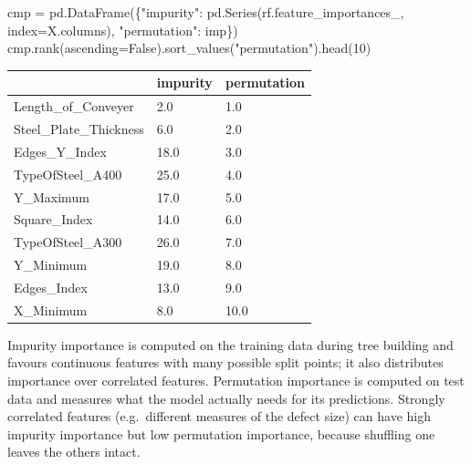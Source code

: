 \documentclass[
  letterpaper,
  DIV=11,
  numbers=noendperiod]{scrreprt}
\newenvironment{Shaded}{\begin{snugshade}}{\end{snugshade}}
\newcommand{\BuiltInTok}[1]{\textcolor[rgb]{0.00,0.23,0.31}{#1}}
\newcommand{\DecValTok}[1]{\textcolor[rgb]{0.68,0.00,0.00}{#1}}
\newcommand{\NormalTok}[1]{\textcolor[rgb]{0.00,0.23,0.31}{#1}}
\newcommand{\OperatorTok}[1]{\textcolor[rgb]{0.37,0.37,0.37}{#1}}
\newcommand{\StringTok}[1]{\textcolor[rgb]{0.13,0.47,0.30}{#1}}
\newcommand{\VariableTok}[1]{\textcolor[rgb]{0.07,0.07,0.07}{#1}}
\begin{document}
\begin{tcolorbox}[enhanced jigsaw, left=2mm, title=\textcolor{quarto-callout-caution-color}{\faFire}\hspace{0.5em}{Solution to Exercise 3}, opacityback=0, breakable, rightrule=.15mm, arc=.35mm, toptitle=1mm, colbacktitle=quarto-callout-caution-color!10!white, opacitybacktitle=0.6, coltitle=black, colframe=quarto-callout-caution-color-frame, bottomrule=.15mm, leftrule=.75mm, bottomtitle=1mm, titlerule=0mm, toprule=.15mm, colback=white]

\begin{Shaded}
\begin{Highlighting}[]
\BuiltInTok{cmp} \OperatorTok{=}\NormalTok{ pd.DataFrame(\{}\StringTok{"impurity"}\NormalTok{: pd.Series(rf.feature\_importances\_, index}\OperatorTok{=}\NormalTok{X.columns),}
                    \StringTok{"permutation"}\NormalTok{: imp\})}
\BuiltInTok{cmp}\NormalTok{.rank(ascending}\OperatorTok{=}\VariableTok{False}\NormalTok{).sort\_values(}\StringTok{"permutation"}\NormalTok{).head(}\DecValTok{10}\NormalTok{)}
\end{Highlighting}
\end{Shaded}

\begin{longtable}[]{@{}lll@{}}
\toprule\noalign{}
& impurity & permutation \\
\midrule\noalign{}
\endhead
\bottomrule\noalign{}
\endlastfoot
Length\_of\_Conveyer & 2.0 & 1.0 \\
Steel\_Plate\_Thickness & 6.0 & 2.0 \\
Edges\_Y\_Index & 18.0 & 3.0 \\
TypeOfSteel\_A400 & 25.0 & 4.0 \\
Y\_Maximum & 17.0 & 5.0 \\
Square\_Index & 14.0 & 6.0 \\
TypeOfSteel\_A300 & 26.0 & 7.0 \\
Y\_Minimum & 19.0 & 8.0 \\
Edges\_Index & 13.0 & 9.0 \\
X\_Minimum & 8.0 & 10.0 \\
\end{longtable}

Impurity importance is computed on the training data during tree
building and favours continuous features with many possible split
points; it also distributes importance over correlated features.
Permutation importance is computed on test data and measures what the
model actually needs for its predictions. Strongly correlated features
(e.g.~different measures of the defect size) can have high impurity
importance but low permutation importance, because shuffling one leaves
the others intact.

\end{tcolorbox}
\end{document}

